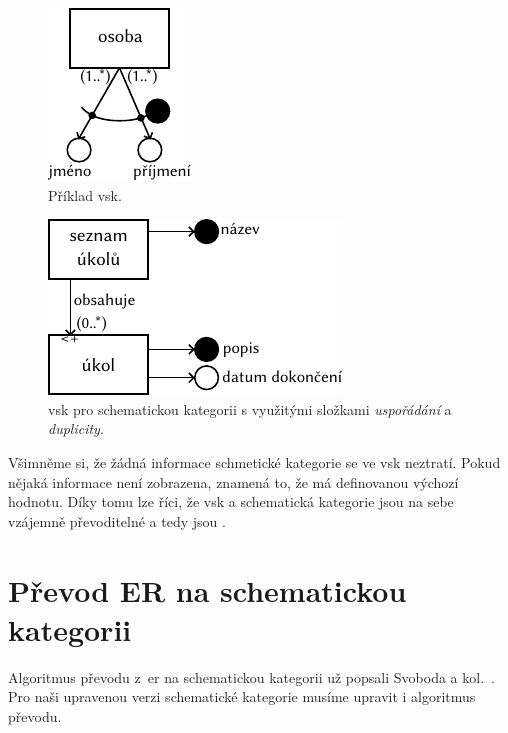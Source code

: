 \begin{figure}[!htb]
  \centering
  \includegraphics[width=\maxwidth{\textwidth}]{../img/schemcat-diagrams/schemcat-visualization-example.pdf}
  \caption{Příklad \acrfull{vsk}.}
  \label{fig:schemcat-visualization-example}
\end{figure}

\begin{figure}[!htb]
  \centering
  \includegraphics[width=\maxwidth{\textwidth}]{../img/schemcat-diagrams/scv-ord-dup.pdf}
  \caption{\acrshort{vsk} pro schematickou kategorii s využitými složkami \emph{uspořádání} a \emph{duplicity}.}
  \label{fig:scv-ord-dup}
\end{figure}

Všimněme si, že žádná informace schmetické kategorie se ve \acrshort{vsk} neztratí.
Pokud nějaká informace není zobrazena, znamená to, že má definovanou výchozí hodnotu.
Díky tomu lze říci, že \acrshort{vsk} a schematická kategorie jsou na sebe vzájemně převoditelné a tedy jsou .

\section{Převod ER na schematickou kategorii}

Algoritmus převodu z~\acrshort{er} na schematickou kategorii už popsali Svoboda a kol.~\cite[s.~192-196]{svoboda_categorical_2021}.
Pro naši upravenou verzi schematické kategorie musíme upravit i algoritmus převodu.


